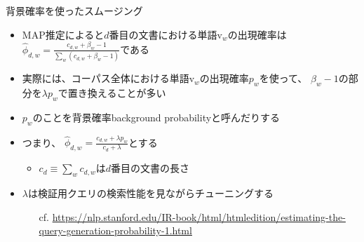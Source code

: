 \documentclass[aspectratio=169,unicode,dvipdfmx,14pt]{beamer}
\begin{document}
\begin{frame}{背景確率を使ったスムージング}
\begin{itemize}
\item MAP推定によると$d$番目の文書における単語$\mbox{v}_w$の出現確率は
$\hat{\phi}_{d,w} = \frac{c_{d,w} + \beta_w - 1}{\sum_w (c_{d,w} + \beta_w - 1)}$である
\item 実際には、コーパス全体における単語$\mbox{v}_w$の出現確率$p_w$を使って、
$\beta_w - 1$の部分を$\lambda p_w$で置き換えることが多い
\item $p_w$のことを背景確率background probabilityと呼んだりする
\item つまり、
$\hat{\phi}_{d,w} = \frac{c_{d,w} + \lambda p_w}{c_d + \lambda}$とする
\begin{itemize}
\item $c_d \equiv \sum_w c_{d,w}$は$d$番目の文書の長さ
\end{itemize}
\item $\lambda$は検証用クエリの検索性能を見ながらチューニングする
\begin{itemize}
\item[cf.] \href{https://nlp.stanford.edu/IR-book/html/htmledition/estimating-the-query-generation-probability-1.html}{{\scriptsize https://nlp.stanford.edu/IR-book/html/htmledition/estimating-the-query-generation-probability-1.html}} 
\end{itemize}
\end{itemize}
\end{frame}
\end{document}
